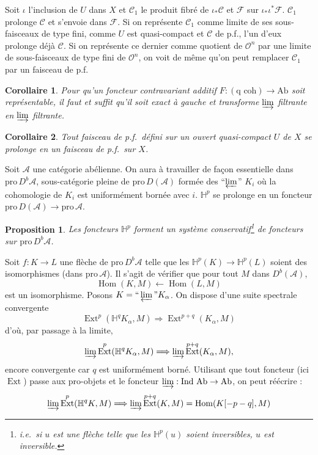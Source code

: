 \documentclass[12pt]{amsart}
\theoremstyle{plain}
\newtheorem{prop}{Proposition}
\newtheorem{cor}{Corollaire}
\theoremstyle{definition}
\DeclareMathOperator{\Hom}{Hom}
\DeclareMathOperator{\Ext}{Ext}
\newcommand{\Ind}{\text{Ind}\,}
\newcommand{\Pro}{\text{pro}\,}
\newcommand{\Ab}{\text{Ab}}
\newcommand{\cF}{\mathcal{F}}
\newcommand{\cO}{\mathcal{O}}
\newcommand{\cC}{\mathcal{C}}
\newcommand{\cA}{\mathcal{A}}
\newcommand{\cDb}{D^{b}}
\newcommand{\cD}{D}
\newcommand{\bH}{\mathbb{H}}
\begin{document}
Soit $\iota$ l'inclusion de $U$ dans $X$ et $\cC_{1}$ le produit fibr\'e de $\iota_{*}\cC$ et $\cF$ sur $\iota_{*}\iota^{*}\cF$. $\cC_{1}$ prolonge $\cC$ et s'envoie dans $\cF$. Si on repr\'esente $\cC_{1}$ comme limite de ses sous-faisceaux de type fini, comme $U$ est quasi-compact et $\cC$ de p.f., l'un d'eux prolonge d\'ej\`a $\cC$. Si on repr\'esente ce dernier comme quotient de $\cO^{n}$ par une limite de sous-faisceaux de type fini de $\cO^{n}$, on voit de m\^eme qu'on peut remplacer $\cC_{1}$ par un faisceau de p.f.

\begin{cor}
Pour qu'un foncteur contravariant additif $F: (\text{q coh}) \to \Ab$ soit repr\'esentable, il faut et suffit qu'il soit exact \`a gauche et transforme $\varinjlim$ filtrante en $\varinjlim$ filtrante.
\end{cor}

\begin{cor}
Tout faisceau de p.f.\ d\'efini sur un ouvert quasi-compact $U$ de $X$ se prolonge en un faisceau de p.f.\ sur $X$.
\end{cor}

\medskip

Soit $\cA$ une cat\'egorie ab\'elienne. On aura \`a travailler de fa\c{c}on essentielle dans $\Pro \cDb\cA$, sous-cat\'egorie pleine de $\Pro \cD(\cA)$ form\'ee des ``$\varprojlim$'' $K_{i}$ o\`u la cohomologie de $K_{i}$ est uniform\'ement born\'ee avec $i$. $\bH^{p}$ se prolonge en un foncteur $\Pro \cD(\cA) \to \Pro \cA$.

\begin{prop}
Les foncteurs $\bH^{p}$ forment un syst\`eme conservatif\footnote{i.e.\ si $u$ est une fl\`eche telle que les $\bH^{p}(u)$ soient inversibles, $u$ est inversible.} de foncteurs sur $\Pro \cDb\cA$.
\end{prop}

Soit $f: K \to L$ une fl\`eche de $\Pro \cDb\cA$ telle que les $\bH^{p}(K) \to \bH^{p}(L)$ soient des isomorphismes (dans $\Pro \cA$). Il s'agit de v\'erifier que pour tout $M$ dans $\cDb(\cA)$,
\[
\Hom(K,M) \longleftarrow \Hom(L,M)
\]
est un isomorphisme. Posons $K = \text{``}\varprojlim\text{''} K_{\alpha}$. On dispose d'une suite spectrale convergente
\[
\Ext^{p}(\bH^{q}K_{\alpha}, M) \Longrightarrow \Ext^{p+q}(K_{\alpha}, M)
\]
d'o\`u, par passage \`a la limite,
\[
\varinjlim \Ext^{p}(\bH^{q}K_{\alpha}, M)
\Longrightarrow
\varinjlim \Ext^{p+q}(K_{\alpha}, M),
\]
encore convergente car $q$ est uniform\'ement born\'e. Utilisant que tout foncteur (ici $\Ext$) passe aux pro-objets et le foncteur $\varinjlim: \Ind\,\Ab \to \Ab$, on peut r\'e\'ecrire :
\[
\varinjlim \Ext^{p}(\bH^{q}K, M) \Longrightarrow \varinjlim \Ext^{p+q}(K,M) = \Hom(K[-p-q],M)
\]
\end{document}
